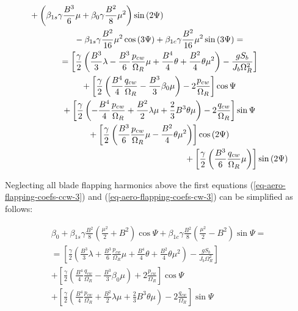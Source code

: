 \begin{gather}
\begin{multlined}[0.88\textwidth]
    +
    \left(
        \beta_{1s} \gamma \frac{B^3}{6} \mu
      + \beta_0 \gamma \frac{B^2}{8} \mu^2
    \right) \sin \left( 2 \Psi \right)
    \\
    -
    \beta_{1s} \gamma \frac{B^2}{16} \mu^2 \cos \left( 3 \Psi \right)
    +
    \beta_{1c} \gamma \frac{B^2}{16} \mu^2 \sin \left( 3 \Psi \right)
    = \\ =
    \left[
      \frac{\gamma}{2}
      \left(
          \frac{B^3}{3} \lambda
        - \frac{B^3}{6} \frac{p_{cw}}{\Omega_R} \mu
        + \frac{B^4}{4} \theta
        + \frac{B^2}{4} \theta \mu^2
      \right) - \frac{ g S_b }{ J_b \Omega_R^2 }
    \right]
    \\
    + \left[
      \frac{\gamma}{2}
      \left(
          \frac{B^4}{4} \frac{q_{cw}}{\Omega_R}
        - \frac{B^3}{3} \beta_0 \mu
      \right) - 2 \frac{p_{cw}}{\Omega_R}
    \right] \cos \Psi
    \\
    + \left[
      \frac{\gamma}{2}
      \left(
        - \frac{B^4}{4} \frac{p_{cw}}{\Omega_R}
        + \frac{B^2}{2} \lambda \mu
        + \frac{2}{3} B^3 \theta \mu
        \right) - 2 \frac{q_{cw}}{\Omega_R}
    \right] \sin \Psi
    \\
    + \left[
      \frac{\gamma}{2}
      \left(
          \frac{B^3}{6} \frac{p_{cw}}{\Omega_R} \mu
        - \frac{B^2}{4} \theta \mu^2
      \right)
    \right] \cos \left( 2 \Psi \right)
    \\
    + \left[
      \frac{\gamma}{2}
      \left( \frac{B^3}{6} \frac{q_{cw}}{\Omega_R} \mu \right)
    \right] \sin \left( 2 \Psi \right)
  \end{multlined}
\end{gather}

Neglecting all blade flapping harmonics above the first \cite{GessowMyers1985} equations (\ref{eq-aero-flapping-coefs-ccw-3}) and (\ref{eq-aero-flapping-coefs-cw-3}) can be simplified as follows:

\begin{multline}
  \label{eq-aero-flapping-coefs-ccw-4}
  \beta_0
  +
  \beta_{1s} \gamma \frac{B^2}{8}
  \left( \frac{\mu^2}{2} + B^2 \right) \cos \Psi
  +
  \beta_{1c} \gamma \frac{B^2}{8}
  \left( \frac{\mu^2}{2} - B^2 \right) \sin \Psi
  = \\ =
  \left[
    \frac{\gamma}{2}
    \left(
        \frac{B^3}{3} \lambda
      + \frac{B^3}{6} \frac{p_{cw}}{\Omega_R} \mu
      + \frac{B^4}{4} \theta
      + \frac{B^2}{4} \theta \mu^2
    \right) - \frac{ g S_b }{ J_b \Omega_R^2 }
  \right]
  \\
  + \left[
    \frac{\gamma}{2}
    \left(
      \frac{B^4}{4} \frac{q_{cw}}{\Omega_R}
      - \frac{B^3}{3} \beta_0 \mu
    \right) + 2 \frac{p_{cw}}{\Omega_R}
  \right] \cos \Psi
  \\
  + \left[
    \frac{\gamma}{2}
    \left(
        \frac{B^4}{4} \frac{p_{cw}}{\Omega_R}
      + \frac{B^2}{2} \lambda \mu
      + \frac{2}{3} B^3 \theta \mu
    \right) - 2 \frac{q_{cw}}{\Omega_R}
  \right] \sin \Psi
\end{multline}

